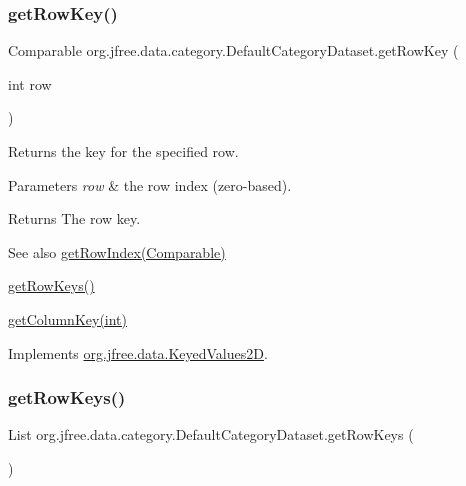 \subsubsection{\texorpdfstring{get\+Row\+Key()}{getRowKey()}}
{\footnotesize\ttfamily Comparable org.\+jfree.\+data.\+category.\+Default\+Category\+Dataset.\+get\+Row\+Key (\begin{DoxyParamCaption}\item[{int}]{row }\end{DoxyParamCaption})}

Returns the key for the specified row.


\begin{DoxyParams}{Parameters}
{\em row} & the row index (zero-\/based).\\
\hline
\end{DoxyParams}
\begin{DoxyReturn}{Returns}
The row key.
\end{DoxyReturn}
\begin{DoxySeeAlso}{See also}
\mbox{\hyperlink{classorg_1_1jfree_1_1data_1_1category_1_1_default_category_dataset_a2ba50eec333627d8a187c2f252b8600a}{get\+Row\+Index(\+Comparable)}} 

\mbox{\hyperlink{classorg_1_1jfree_1_1data_1_1category_1_1_default_category_dataset_abc377b9d7b99192614e8a35984d7d5d3}{get\+Row\+Keys()}} 

\mbox{\hyperlink{classorg_1_1jfree_1_1data_1_1category_1_1_default_category_dataset_a830798ee850da00ea96dcf29f28c70e7}{get\+Column\+Key(int)}} 
\end{DoxySeeAlso}


Implements \mbox{\hyperlink{interfaceorg_1_1jfree_1_1data_1_1_keyed_values2_d_a7c145e2383036a479460e4bca7b40a95}{org.\+jfree.\+data.\+Keyed\+Values2D}}.

\mbox{\label{classorg_1_1jfree_1_1data_1_1category_1_1_default_category_dataset_abc377b9d7b99192614e8a35984d7d5d3}} 
\subsubsection{\texorpdfstring{get\+Row\+Keys()}{getRowKeys()}}
{\footnotesize\ttfamily List org.\+jfree.\+data.\+category.\+Default\+Category\+Dataset.\+get\+Row\+Keys (\begin{DoxyParamCaption}{ }\end{DoxyParamCaption})}

